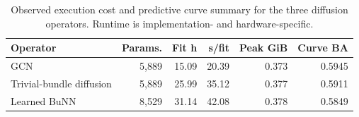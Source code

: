 \begin{table}[!t]
\centering
\caption{Observed execution cost and predictive curve summary for the three diffusion operators. Runtime is implementation- and hardware-specific.}
\label{tab:efficiency}
\footnotesize
\begin{tabular}{lrrrrr}
\toprule
Operator & Params. & Fit h & s/fit & Peak GiB & Curve BA \\
\midrule
GCN & 5,889 & 15.09 & 20.39 & 0.373 & 0.5945 \\
Trivial-bundle diffusion & 5,889 & 25.99 & 35.12 & 0.377 & 0.5911 \\
Learned BuNN & 8,529 & 31.14 & 42.08 & 0.378 & 0.5849 \\
\bottomrule
\end{tabular}
\end{table}
